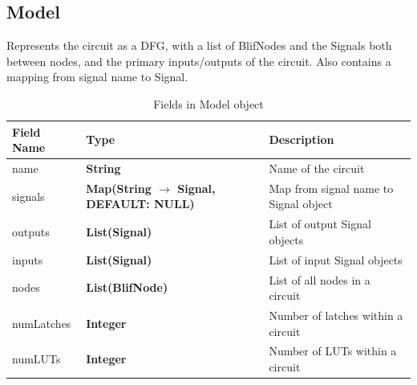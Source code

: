 \documentclass[12pt,final,oneside,a4paper]{dwThesis} %
\begin{document}
   \subsection{Model}
   Represents the circuit as a \gls{DFG}, with a list of
   BlifNodes and the Signals both between nodes, and the primary inputs/outputs
   of the circuit.  Also contains a mapping from signal name to Signal.

   \begin{table}
      \begin{center}

      \begin{tabularx}
         {\linewidth}{lXX} \toprule Field Name & Type &
         Description\\
         \midrule name & \textbf{String} & Name of the circuit
         \\
         signals & \textbf{Map(String $\to$ Signal, DEFAULT: NULL)} & Map
         from signal name to Signal object \\
         outputs & \textbf{List(Signal)} &
         List of output Signal objects \\
         inputs & \textbf{List(Signal)} & List
         of input Signal objects \\
         nodes & \textbf{List(BlifNode)} & List of
         all nodes in a circuit \\
         numLatches & \textbf{Integer} & Number of
         latches within a circuit \\
         numLUTs & \textbf{Integer} & Number of
         LUTs within a circuit \\
         \bottomrule 
      \end{tabularx}
      \caption{Fields in
         Model object} 
   \end{center}\end{table}
\end{document}
